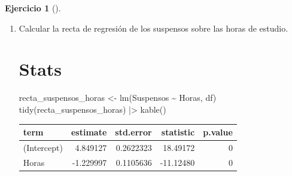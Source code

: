 \documentclass[
  a4paper,
]{scrreport}
\newenvironment{Shaded}{\begin{snugshade}}{\end{snugshade}}
\newcommand{\ExtensionTok}[1]{\textcolor[rgb]{0.00,0.23,0.31}{#1}}
\newcommand{\FunctionTok}[1]{\textcolor[rgb]{0.28,0.35,0.67}{#1}}
\newcommand{\NormalTok}[1]{\textcolor[rgb]{0.00,0.23,0.31}{#1}}
\newcommand{\OtherTok}[1]{\textcolor[rgb]{0.00,0.23,0.31}{#1}}
\newcommand{\SpecialCharTok}[1]{\textcolor[rgb]{0.37,0.37,0.37}{#1}}
\theoremstyle{definition}
\newtheorem{exercise}{Ejercicio}[chapter]
\theoremstyle{remark}
\begin{document}
\begin{exercise}[]
\begin{enumerate}
\begin{tcolorbox}
\begin{Shaded}
\begin{Highlighting}[]
\ExtensionTok{Dibujar}\NormalTok{ un diagrama de dispersión con los valores de la columna Horas del data frame df el eje x y los valores de la columna Suspensos en el eje y.}
\end{Highlighting}
\end{Shaded}

  El tipo de modelo que mejor se ajusta es lineal, ya que hay una
  tendencia lineal en la nube de puntos y además es inversa.

  \end{tcolorbox}
\item
  Calcular la recta de regresión de los suspensos sobre las horas de
  estudio.

  \begin{tcolorbox}[enhanced jigsaw, colframe=quarto-callout-tip-color-frame, toprule=.15mm, bottomtitle=1mm, breakable, opacitybacktitle=0.6, toptitle=1mm, colback=white, bottomrule=.15mm, title=\textcolor{quarto-callout-tip-color}{\faLightbulb}\hspace{0.5em}{Solución}, arc=.35mm, left=2mm, titlerule=0mm, rightrule=.15mm, coltitle=black, leftrule=.75mm, opacityback=0, colbacktitle=quarto-callout-tip-color!10!white]

  \section{Stats}

\begin{Shaded}
\begin{Highlighting}[]
\NormalTok{recta\_suspensos\_horas }\OtherTok{\textless{}{-}} \FunctionTok{lm}\NormalTok{(Suspensos }\SpecialCharTok{\textasciitilde{}}\NormalTok{ Horas, df) }
\FunctionTok{tidy}\NormalTok{(recta\_suspensos\_horas) }\SpecialCharTok{|\textgreater{}} \FunctionTok{kable}\NormalTok{()}
\end{Highlighting}
\end{Shaded}

  \begin{longtable}[]{@{}lrrrr@{}}
  \toprule\noalign{}
  term & estimate & std.error & statistic & p.value \\
  \midrule\noalign{}
  \endhead
  \bottomrule\noalign{}
  \endlastfoot
  (Intercept) & 4.849127 & 0.2622323 & 18.49172 & 0 \\
  Horas & -1.229997 & 0.1105636 & -11.12480 & 0 \\
  \end{longtable}


\end{tcolorbox}
\end{enumerate}
\end{exercise}
\end{document}
